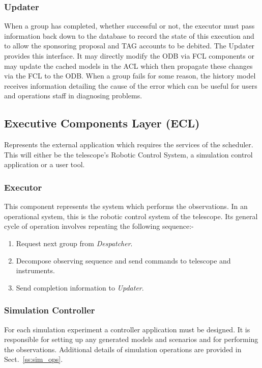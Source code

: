 \subsubsection{Updater}
When a group has completed, whether successful or not, the executor must pass information back down to the database to record the state of this execution and to allow the sponsoring proposal and TAG accounts to be debited. The Updater provides this interface. It may directly modify the ODB via FCL components or may update the cached models in the ACL which then propagate these changes via the FCL to the ODB. When a group fails for some reason, the history model receives information detailing the cause of the error which can be useful for users and operations staff in diagnosing problems.

\subsection{Executive Components Layer (ECL)} 
Represents the external application which requires the services of the scheduler. This will either be the telescope's Robotic Control System, a simulation control application or a user tool.
\subsubsection{Executor}
This component represents the system which performs the observations. In an operational system, this is the robotic control system of the telescope. Its general cycle of operation involves repeating the following sequence:-

\begin{enumerate}
\item Request next group from \emph{Despatcher}. 
\item Decompose observing sequence and send commands to telescope and instruments.
\item Send completion information to \emph{Updater}.
\end{enumerate}

\subsubsection{Simulation Controller}
For each simulation experiment a controller application must be designed. It is responsible for setting up any generated models and scenarios and for performing the observations. Additional details of simulation operations are provided in Sect.~\ref{ss:sim_ops}.

